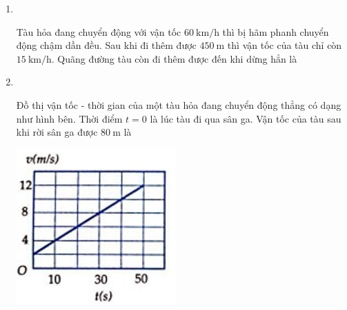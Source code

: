 \begin{enumerate}[label=\bfseries Câu \arabic*:,leftmargin=1.5cm]
\item {}\\
{Tàu hỏa đang chuyển động với vận tốc $\SI{60}{\kilo\meter/\hour}$ thì bị hãm phanh chuyển động chậm dần đều. Sau khi đi thêm được $\SI{450}{\meter}$ thì vận tốc của tàu chỉ còn $\SI{15}{\kilo\meter/\hour}$. Quãng đường tàu còn đi thêm được đến khi dừng hẳn là
}
	\item {}\\
	{\begin{minipage}[l]{0.65\textwidth}
			Đồ thị vận tốc - thời gian của một tàu hỏa đang chuyển động thẳng có dạng như hình bên. Thời điểm $t = 0$ là lúc tàu đi qua sân ga. Vận tốc của tàu sau khi rời sân ga được $\SI{80}{\meter}$ là
		\end{minipage}
		\begin{minipage}{0.35\textwidth}
			\begin{center}
				\includegraphics[width=0.5\linewidth]{../figs/VN10-2022-PH-TP008-P-3}
			\end{center}
		\end{minipage}
	}
\end{enumerate}

